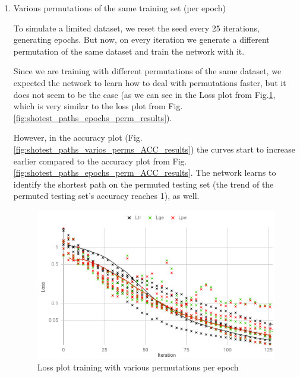 \begin{enumerate}[label=(\Alph*)]
        \item Various permutations of the same training set (per epoch)
        
        To simulate a limited dataset, we reset the seed every 25 iterations, generating epochs. But now, on every iteration we generate a different permutation of the same dataset and train the network with it.
        
        Since we are training with different permutations of the same dataset, we expected the network to learn how to deal with permutations faster, but it does not seem to be the case (as we can see in the Loss plot from Fig.\ref{fig:shotest_paths_varios_perms_results}, which is very similar to the loss plot from Fig.\ref{fig:shotest_paths_epochs_perm_results}).
        
        However, in the accuracy plot (Fig.\ref{fig:shotest_paths_varios_perms_ACC_results}) the curves start to increase earlier compared to the accuracy plot from Fig.\ref{fig:shotest_paths_epochs_perm_ACC_results}. The network learns to identify the shortest path on the permuted testing set (the trend of the permuted testing set's accuracy reaches 1), as well.
        
        \begin{figure}[H]
            \centering
            \includegraphics[width=.9\linewidth]{fig/content/results/shortest_path/various_perms_per_epoch.png}
            \caption{Loss plot training with various permutations per epoch}
            \label{fig:shotest_paths_varios_perms_results}
        \end{figure}
        

\end{enumerate}
